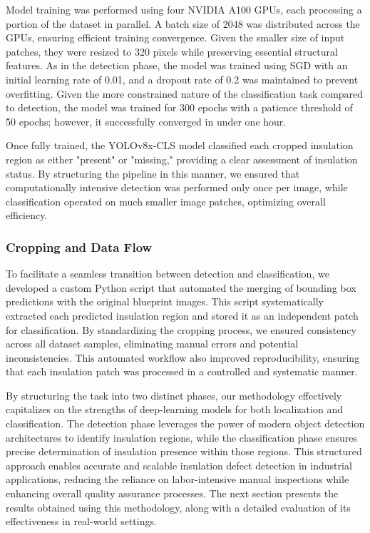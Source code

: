 \documentclass[]{IEEEphot}
\begin{document}
Model training was performed using four NVIDIA A100 GPUs, each processing a portion of the dataset in parallel. A batch size of 2048 was distributed across the GPUs, ensuring efficient training convergence. Given the smaller size of input patches, they were resized to 320 pixels while preserving essential structural features. As in the detection phase, the model was trained using SGD with an initial learning rate of 0.01, and a dropout rate of 0.2 was maintained to prevent overfitting. Given the more constrained nature of the classification task compared to detection, the model was trained for 300 epochs with a patience threshold of 50 epochs; however, it successfully converged in under one hour.

Once fully trained, the YOLOv8x-CLS model classified each cropped insulation region as either "present" or "missing," providing a clear assessment of insulation status. By structuring the pipeline in this manner, we ensured that computationally intensive detection was performed only once per image, while classification operated on much smaller image patches, optimizing overall efficiency.

\subsubsection{Cropping and Data Flow}

To facilitate a seamless transition between detection and classification, we developed a custom Python script that automated the merging of bounding box predictions with the original blueprint images. This script systematically extracted each predicted insulation region and stored it as an independent patch for classification. By standardizing the cropping process, we ensured consistency across all dataset samples, eliminating manual errors and potential inconsistencies. This automated workflow also improved reproducibility, ensuring that each insulation patch was processed in a controlled and systematic manner.

By structuring the task into two distinct phases, our methodology effectively capitalizes on the strengths of deep-learning models for both localization and classification. The detection phase leverages the power of modern object detection architectures to identify insulation regions, while the classification phase ensures precise determination of insulation presence within those regions. This structured approach enables accurate and scalable insulation defect detection in industrial applications, reducing the reliance on labor-intensive manual inspections while enhancing overall quality assurance processes. The next section presents the results obtained using this methodology, along with a detailed evaluation of its effectiveness in real-world settings.
\end{document}
